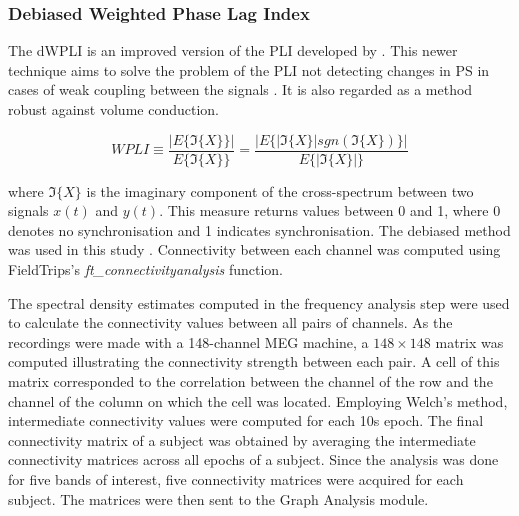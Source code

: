			\subsubsection{Debiased Weighted Phase Lag Index}	
			The \ac{dWPLI} is an improved version of the \ac{PLI} developed by \textcite{Stam2007}. This newer technique aims to solve the problem of the \ac{PLI} not detecting changes in \ac{PS} in cases of weak coupling between the signals \autocite{Vinck2011}. It is also regarded as a method robust against volume conduction.

			\begin{equation}\label{eq:WPLI}
				{WPLI} \equiv \frac{|E\{\Im\{X\}\}|}{E\{\Im\{X\}\}} = \frac{|E\{|\Im\{X\}|sgn(\Im\{X\})\}|}{E\{|\Im\{X\}|\}}
			\end{equation}

			where \(\Im\{X\}\) is the imaginary component of the cross-spectrum between two signals \(x(t)\) and \(y(t)\). This measure returns values between 0 and 1, where 0 denotes no synchronisation and 1 indicates synchronisation. The debiased method was used in this study \autocite{Vinck2011}. Connectivity between each channel was computed using FieldTrips's \textit{ft_connectivityanalysis} function.





		 The spectral density estimates computed in the frequency analysis step were used to calculate the connectivity values between all pairs of channels. As the recordings were made with a 148-channel \ac{MEG} machine, a \(148\times148\) matrix was computed illustrating the connectivity strength between each pair. A cell of this matrix corresponded to the correlation between the channel of the row and the channel of the column on which the cell was located. Employing Welch's method, intermediate connectivity values were computed for each 10s epoch. The final connectivity matrix of a subject was obtained by averaging the intermediate connectivity matrices across all epochs of a subject. Since the analysis was done for five bands of interest, five connectivity matrices were acquired for each subject. The matrices were then sent to the Graph Analysis module. 

